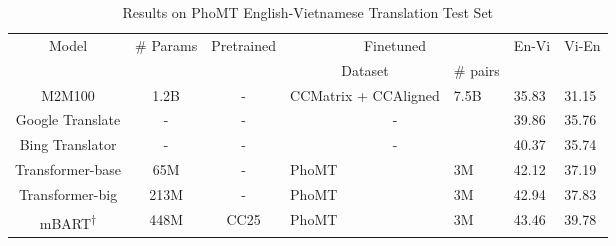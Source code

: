 \documentclass[11pt]{article}
\begin{document}
 \begin{table*}[ht]
\centering
\caption{Results on PhoMT English-Vietnamese Translation Test Set}

\begin{threeparttable}

\begin{tabular}{c|c|c|ll|l|l}
\hline
\multirow{2}{*}{Model}       & \multicolumn{1}{l|}{\multirow{2}{*}{\# Params}} & \multirow{2}{*}{Pretrained} & \multicolumn{2}{c|}{Finetuned}                       & \multicolumn{1}{c|}{\multirow{2}{*}{En-Vi}} & \multicolumn{1}{c}{\multirow{2}{*}{Vi-En}} \\ \cline{4-5}
                             & \multicolumn{1}{l|}{}                           &                              & \multicolumn{1}{c|}{Dataset}              & \# pairs & \multicolumn{1}{c|}{}                       & \multicolumn{1}{c}{}                       \\ \hline
M2M100                       & 1.2B                                            & -                            & \multicolumn{1}{l|}{CCMatrix + CCAligned} & 7.5B     & 35.83                                       & 31.15                                      \\ \hline
Google Translate             & -                                               & -                            & \multicolumn{2}{c|}{-}                               & 39.86                                       & 35.76                                      \\ \hline
Bing Translator              & -                                               & -                            & \multicolumn{2}{c|}{-}                               & 40.37                                       & 35.74                                      \\ \hline
Transformer-base             & 65M                                             & -                            & \multicolumn{1}{l|}{PhoMT}                & 3M       & 42.12                                       & 37.19                                      \\ \hline
Transformer-big            & 213M                                            & -                            & \multicolumn{1}{l|}{PhoMT}                & 3M       & 42.94                                       & 37.83                                      \\ \hline
mBART\textsuperscript{$\dagger$}                       & 448M                                            & CC25                         & \multicolumn{1}{l|}{PhoMT}                & 3M       & 43.46                                       & 39.78                                      \\ \hline

\end{tabular}
\end{threeparttable}
\end{table*}
\end{document}
